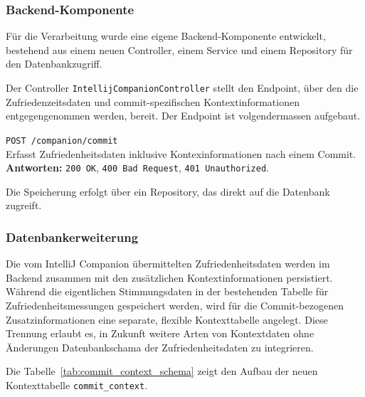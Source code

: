 \documentclass[12pt,a4paper]{report}
\begin{document}
\subsubsection{Backend-Komponente}

Für die Verarbeitung wurde eine eigene Backend-Komponente entwickelt, bestehend aus einem neuen Controller, einem Service und
einem Repository für den Datenbankzugriff. 

Der Controller \texttt{IntellijCompanionController} stellt den Endpoint, über den die Zufriedenzeitsdaten und commit-spezifischen
Kontextinformationen entgegengenommen werden, bereit. Der Endpoint ist volgendermassen aufgebaut.

\begin{description}
  \item \texttt{POST /companion/commit} \\
        Erfasst Zufriedenheitsdaten inklusive Kontexinformationen nach einem Commit. \\
        \textbf{Antworten:} \texttt{200 OK}, \texttt{400 Bad Request}, \texttt{401 Unauthorized}.
\end{description}

Die Speicherung erfolgt über ein Repository, das direkt auf die Datenbank zugreift.

\subsubsection{Datenbankerweiterung}

Die vom IntelliJ Companion übermittelten Zufriedenheitsdaten werden im Backend zusammen mit den zusätzlichen Kontextinformationen
persistiert. Während die eigentlichen Stimmungsdaten in der bestehenden Tabelle für Zufriedenheitsmessungen gespeichert werden,
wird für die Commit-bezogenen Zusatzinformationen eine separate, flexible Kontexttabelle angelegt. Diese Trennung erlaubt es, in
Zukunft weitere Arten von Kontextdaten ohne Änderungen Datenbankschama der Zufriedenheitsdaten zu integrieren.

Die Tabelle~\ref{tab:commit_context_schema} zeigt den Aufbau der neuen Kontexttabelle \texttt{commit\_context}.
\end{document}
